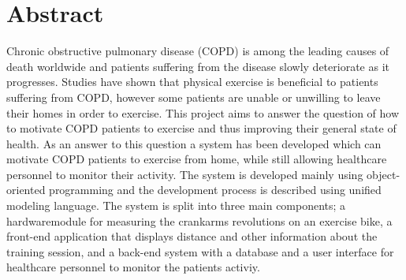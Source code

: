 \chapter*{Abstract}
Chronic obstructive pulmonary disease (COPD) is among the leading causes of death worldwide and patients suffering from the disease slowly deteriorate as it progresses. Studies have shown that physical exercise is beneficial to patients suffering from COPD, however some patients are unable or unwilling to leave their homes in order to exercise. This project aims to answer the question of how to motivate COPD patients to exercise and thus improving their general state of health. As an answer to this question a system has been developed which can motivate COPD patients to exercise from home, while still allowing healthcare personnel to monitor their activity. The system is developed mainly using object-oriented programming and the development process is described using unified modeling language. The system is split into three main components; a hardwaremodule for measuring the crankarms revolutions on an exercise bike, a front-end application that displays distance and other information about the training session, and a back-end system with a database and a user interface for healthcare personnel to monitor the patients activiy. 